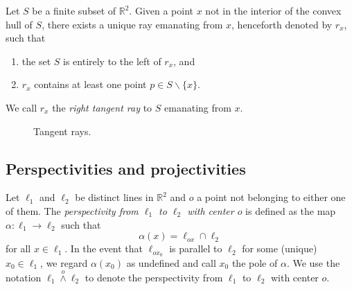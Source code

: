 \documentclass[11pt]{amsart}
\theoremstyle{remark}
\numberwithin{equation}{section}
\newcommand{\R}{\mathbb{R}}
\begin{document}
Let $S$ be a finite subset of $\R^2$. Given a point $x$ not in the interior of the convex hull of $S$, there exists a unique ray emanating from $x$, henceforth denoted by $r_x$, such that
\begin{enumerate}
 \item the set $S$ is entirely to the left of $r_x$, and
\item $r_x$ contains at least one point $p\in S\backslash \{x\}$.
\end{enumerate}
We call $r_x$ the \emph{right tangent ray} to $S$ emanating from $x$.
 
\begin{figure}[hp]

\hspace{2cm}


\caption{Tangent rays.}
\label{fig_perspectivities}
\end{figure} 
 
\subsection{Perspectivities and projectivities}
Let $\ell_1$ and $\ell_2$ be distinct lines in $\R^2$ and $o$ a point not belonging to either one of them. The \emph{perspectivity from $\ell_1$ to $\ell_2$ with center $o$} is defined as the map $\alpha\colon \ell_1\to \ell_2$
such that 
\[
\alpha(x)=\ell_{ox}\cap \ell_2
\]
for all $x\in \ell_1$.  In the event that $\ell_{ox_0}$ is parallel to $\ell_2$ for some (unique) $x_0\in \ell_1$, we regard $\alpha(x_0)$ as undefined  and call $x_0$ the pole of $\alpha$. We use the notation $\ell_1\stackrel{o}{\wedge}\ell_2$ to denote  the perspectivity from $\ell_1$ to $\ell_2$ with center $o$.
\end{document}
